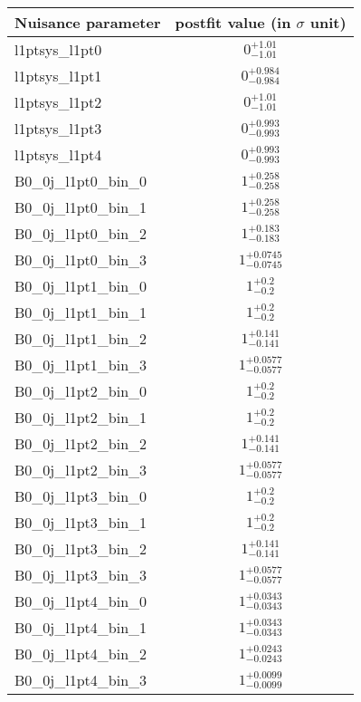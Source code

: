 
\begin{tabular}{|l|c|}
\hline
Nuisance parameter & postfit value (in $\sigma$ unit) \\\hline
l1ptsys\_l1pt0 & $0^{+1.01}_{-1.01}$ \\
l1ptsys\_l1pt1 & $0^{+0.984}_{-0.984}$ \\
l1ptsys\_l1pt2 & $0^{+1.01}_{-1.01}$ \\
l1ptsys\_l1pt3 & $0^{+0.993}_{-0.993}$ \\
l1ptsys\_l1pt4 & $0^{+0.993}_{-0.993}$ \\
B0\_0j\_l1pt0\_bin\_0 & $1^{+0.258}_{-0.258}$ \\
B0\_0j\_l1pt0\_bin\_1 & $1^{+0.258}_{-0.258}$ \\
B0\_0j\_l1pt0\_bin\_2 & $1^{+0.183}_{-0.183}$ \\
B0\_0j\_l1pt0\_bin\_3 & $1^{+0.0745}_{-0.0745}$ \\
B0\_0j\_l1pt1\_bin\_0 & $1^{+0.2}_{-0.2}$ \\
B0\_0j\_l1pt1\_bin\_1 & $1^{+0.2}_{-0.2}$ \\
B0\_0j\_l1pt1\_bin\_2 & $1^{+0.141}_{-0.141}$ \\
B0\_0j\_l1pt1\_bin\_3 & $1^{+0.0577}_{-0.0577}$ \\
B0\_0j\_l1pt2\_bin\_0 & $1^{+0.2}_{-0.2}$ \\
B0\_0j\_l1pt2\_bin\_1 & $1^{+0.2}_{-0.2}$ \\
B0\_0j\_l1pt2\_bin\_2 & $1^{+0.141}_{-0.141}$ \\
B0\_0j\_l1pt2\_bin\_3 & $1^{+0.0577}_{-0.0577}$ \\
B0\_0j\_l1pt3\_bin\_0 & $1^{+0.2}_{-0.2}$ \\
B0\_0j\_l1pt3\_bin\_1 & $1^{+0.2}_{-0.2}$ \\
B0\_0j\_l1pt3\_bin\_2 & $1^{+0.141}_{-0.141}$ \\
B0\_0j\_l1pt3\_bin\_3 & $1^{+0.0577}_{-0.0577}$ \\
B0\_0j\_l1pt4\_bin\_0 & $1^{+0.0343}_{-0.0343}$ \\
B0\_0j\_l1pt4\_bin\_1 & $1^{+0.0343}_{-0.0343}$ \\
B0\_0j\_l1pt4\_bin\_2 & $1^{+0.0243}_{-0.0243}$ \\
B0\_0j\_l1pt4\_bin\_3 & $1^{+0.0099}_{-0.0099}$ \\
\hline
\end{tabular}
